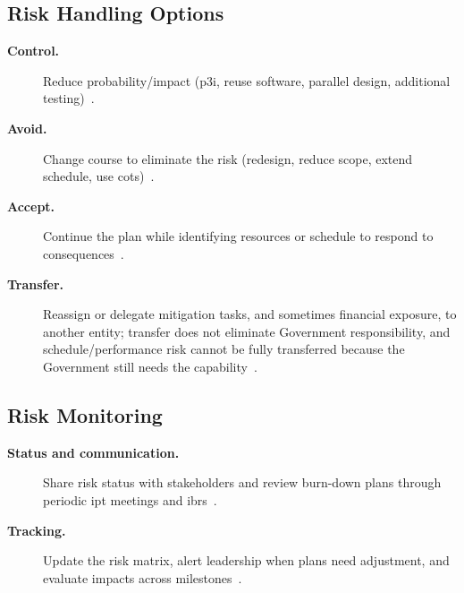 \documentclass[../main.tex]{subfiles}
\begin{document}
\subsection{Risk Handling Options}
\begin{description}
  \item[\textbf{Control.}] Reduce probability/impact (\ac{p3i}, reuse software, parallel design, additional testing)~\autocite{edo-3-3-6-risk-management-problem-solving-2025}.
  \item[\textbf{Avoid.}] Change course to eliminate the risk (redesign, reduce scope, extend schedule, use \ac{cots})~\autocite{edo-3-3-6-risk-management-problem-solving-2025}.
  \item[\textbf{Accept.}] Continue the plan while identifying resources or schedule to respond to consequences~\autocite{edo-3-3-6-risk-management-problem-solving-2025}.
  \item[\textbf{Transfer.}] Reassign or delegate mitigation tasks, and sometimes financial exposure, to another entity; transfer does not eliminate Government responsibility, and schedule/performance risk cannot be fully transferred because the Government still needs the capability~\autocite{edo-3-3-6-risk-management-problem-solving-2025,DoD-RIO-Guide-2017}.
\end{description}

\subsection{Risk Monitoring}
\begin{description}
  \item[\textbf{Status and communication.}] Share risk status with stakeholders and review burn-down plans through periodic \ac{ipt} meetings and \acp{ibr}~\autocite{edo-3-3-6-risk-management-problem-solving-2025}.
  \item[\textbf{Tracking.}] Update the risk matrix, alert leadership when plans need adjustment, and evaluate impacts across milestones~\autocite{edo-3-3-6-risk-management-problem-solving-2025}.
\end{description}
\end{document}
